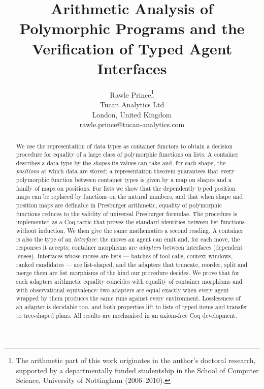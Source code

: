 \documentclass{fundam}
\begin{document}
\title{Arithmetic Analysis of Polymorphic Programs and the Verification of Typed Agent Interfaces}

\address{R.~Prince, Tucan Analytics Ltd, London, United Kingdom}

\author{Rawle Prince\thanks{The arithmetic part of this work originates in the author's
    doctoral research, supported by a departmentally funded studentship in the School of
    Computer Science, University of Nottingham (2006--2010).}\\
Tucan Analytics Ltd \\
London, United Kingdom\\
rawle.prince{@}tucan-analytics.com}

\maketitle


\begin{abstract}
We use the representation of data types as container functors to obtain a decision
procedure for equality of a large class of polymorphic functions on lists.  A container
describes a data type by the \emph{shapes} its values can take and, for each shape, the
\emph{positions} at which data are stored; a representation theorem guarantees that every
polymorphic function between container types is given by a map on shapes and a family of
maps on positions.  For lists we show that the dependently typed position maps can be
replaced by functions on the natural numbers, and that when shape and position maps are definable in Presburger
arithmetic, equality of polymorphic functions reduces to the validity of universal
Presburger formulae.  The procedure is implemented as a Coq tactic that proves the
standard identities between list functions without induction.
We then give the same mathematics a second reading.  A container is also the type of an
\emph{interface}: the moves an agent can emit and, for each move, the responses it
accepts; container morphisms are \emph{adapters} between interfaces (dependent lenses).
Interfaces whose moves are lists --- batches of tool calls, context windows, ranked
candidates --- are list-shaped, and the adapters that truncate, reorder, split and merge
them are list morphisms of the kind our procedure decides.  We prove that for such
adapters arithmetic equality coincides with equality of container morphisms and with
observational equivalence: two adapters are equal exactly when every agent wrapped by
them produces the same runs against every environment.  Losslessness of an adapter is
decidable too, and both properties lift to lists of typed items and transfer to
tree-shaped plans.  All results are mechanised in an axiom-free Coq development.
\end{abstract}
\end{document}
